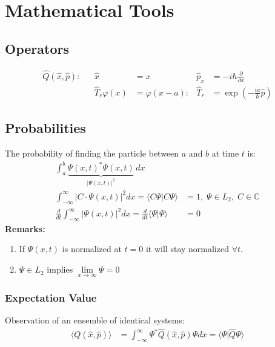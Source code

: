 \section{Mathematical Tools}

\subsection{Operators}
\noindent\begin{align*}
    \hat{Q}(\hat{x},\hat{p}): &  & \widehat{x}              & =x             & \widehat{p}_x & = -i\hbar \frac{\partial}{\partial x}            \\
                              &  & \widehat{T}_r \varphi(x) & = \varphi(x-a): & \widehat{T}_r & = \exp\left(-\frac{ia}{\hbar} \widehat{p}\right)
\end{align*}

\subsection{Probabilities}
The probability of finding the particle between $a$ and $b$ at time $t$ is:
\begin{align*}
    \int_a^b \underbrace{{\Psi(x,t)}^*\Psi(x,t)}_{|\Psi(x,t)|^2}\,dx                                                                                    \\
    \int_{-\infty}^{\infty} |C\cdot \Psi(x,t)|^2 dx                                 = \langle C\Psi|C\Psi\rangle & = 1,\;\Psi\in L_2, \; C\in\mathbb{C} \\
    \frac{d}{dt}\int_{-\infty}^{\infty} |\Psi(x,t)|^2 dx = \frac{d}{dt}\langle\Psi|\Psi\rangle                   & = 0
\end{align*}
\textbf{Remarks:}
\begin{enumerate}
    \item If $\Psi(x,t)$ is normalized at $t=0$ it will stay normalized $\forall t$.
    \item $\Psi \in L_2$ implies $\lim \limits_{x \to \infty}\Psi=0$
\end{enumerate}

\subsubsection{Expectation Value}
Observation of an ensemble of identical systems:
\noindent\begin{align*}
    \langle Q(\hat{x},\hat{p})\rangle & = \int_{-\infty}^{\infty}\Psi^*\hat{Q}(\hat{x},\hat{p})\Psi dx = \langle\Psi|\widehat{Q}\Psi\rangle
\end{align*}

